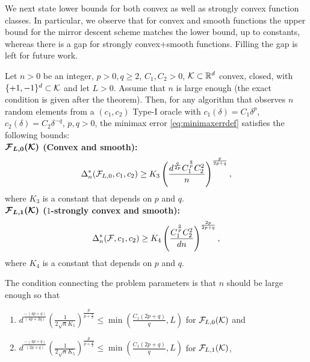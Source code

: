 We next state lower bounds for both convex as well as strongly convex function classes. In particular, we observe that for convex and smooth functions the upper bound for the mirror descent scheme matches the lower bound, up to constants, whereas there is a gap for strongly convex+smooth functions.
Filling the gap is left for future work.
\begin{theorem}
\label{thm:lb-convex}
Let $n>0$ be an integer, $p>0, q\ge 2$, $C_1,C_2>0$,
$\mathcal{K}\subset \mathbb{R}^d$ convex, closed, with  $\{+1,-1\}^d\subset \mathcal{K}$ and let $L>0$.
Assume that $n$ is large enough (the exact condition is given after the theorem).
Then, for any algorithm that observes $n$ random elements from a $(c_1,c_2)$ Type-I oracle
 with $c_1(\delta) = C_1 \delta^p$, $c_2(\delta) = C_2 \delta^{-q}$, $p,q>0$,
 the minimax error \eqref{eq:minimaxerrdef} satisfies the following bounds:\\
\textbf{$\bm{\mathcal{F}_{L,0}(\mathcal{K})}$ (Convex and smooth):}
\[
\Delta_n^{*}(\mathcal{F}_{L,0}, c_1,c_2) \ge K_3 \left(\dfrac{d^{\frac{q}{2p}}  C_1^{\frac{q}{p}} C_2^2}{ n}\right)^{\frac{p}{2p+q}},
\]
where $K_3$ is a constant that depends on $p$ and $q$.\\
\textbf{$\bm{\mathcal{F}_{L,1}(\mathcal{K})}$ ($1$-strongly convex and smooth):}
\[
\Delta_n^{*}(\mathcal{F}, c_1,c_2) \ge K_4  \left(\dfrac{C_1^{\frac{q}{p}} C_2^2 }{ {d n}}\right)^{\frac{2p}{2p+q}},
\]
where $K_4$ is a constant that depends on $p$ and $q$.
\end{theorem}
The condition connecting the problem parameters is that $n$ should be large enough so that
\begin{enumerate}[\bfseries (i)]
\item $d^{\frac{-(4p+q)}{(4p+2q)}}\left(\frac{1}{2\sqrt{n} K_5} \right)^{\frac{p}{p+\frac{q}{2}}}\le \min( \frac{C_1 (2p+q)}{q},  L)$ for $\mathcal{F}_{L,0}(\mathcal{K})$ and
\item $d^{\frac{-(4p+q)}{(2p+q)}}\left(\frac{1}{2\sqrt{n} K_5} \right)^{\frac{p}{p+\frac{q}{2}}} \le \min( \frac{C_1 (2p+q)}{q},  L)$ for $\mathcal{F}_{L,1}(\mathcal{K})$,
\end{enumerate}
